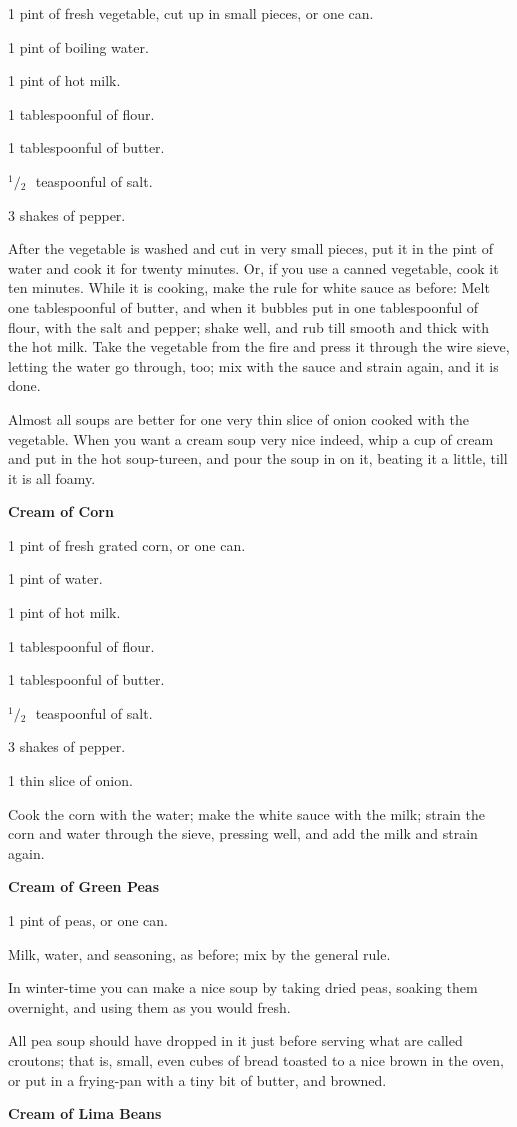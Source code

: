 \documentclass[11pt]{book}
\newcommand{\indpar}{\par\noindent\hspace*{\parindent}}
\newcommand{\ingredient}{\indpar}
\newcommand{\instruction}{\indpar}
\newcommand{\OneHalf}{\ensuremath{{}^1\!\!/\!{}_2\mbox{\ }}}
\newenvironment{RecipeTitle}{\medskip\begin{center}\large\bf }{\end{center}\smallskip}
\begin{document}
\ingredient  1 pint of fresh vegetable, cut up in small pieces, or one can.
\ingredient  1 pint of boiling water.
\ingredient  1 pint of hot milk.
\ingredient  1 tablespoonful of flour.
\ingredient  1 tablespoonful of butter.
\ingredient  \OneHalf teaspoonful of salt.
\ingredient  3 shakes of pepper.
\instruction
  After the vegetable is washed and cut in very small pieces,
put it in the pint of water and cook it for twenty minutes.
Or, if you use a canned vegetable, cook it ten minutes.
While it is cooking, make the rule for white sauce as before:
Melt one tablespoonful of butter, and when it bubbles put in
one tablespoonful of flour, with the salt and pepper; shake
well, and rub till smooth and thick with the hot milk.  Take
the vegetable from the fire and press it through the wire
sieve, letting the water go through, too; mix with the sauce
and strain again, and it is done.
\instruction
  Almost all soups are better for one very thin slice of
onion cooked with the vegetable.  When you want a cream soup
very nice indeed, whip a cup of cream and put in the hot
soup-tureen, and pour the soup in on it, beating it a little,
till it is all foamy.
\begin{RecipeTitle}
Cream of Corn\label{cream_of_corn}
\end{RecipeTitle}
\ingredient  1 pint of fresh grated corn, or one can.
\ingredient  1 pint of water.
\ingredient  1 pint of hot milk.
\ingredient  1 tablespoonful of flour.
\ingredient  1 tablespoonful of butter.
\ingredient  \OneHalf teaspoonful of salt.
\ingredient  3 shakes of pepper.
\ingredient  1 thin slice of onion.
\instruction
  Cook the corn with the water; make the white sauce with the
milk; strain the corn and water through the sieve, pressing
well, and add the milk and strain again.
\begin{RecipeTitle}
Cream of Green Peas\label{cream_of_green_peas}
\end{RecipeTitle}
\ingredient  1 pint of peas, or one can.
\ingredient  Milk, water, and seasoning, as before; mix by the general
rule.
\instruction
  In winter-time you can make a nice soup by taking dried
peas, soaking them overnight, and using them as you would
fresh.
\instruction
  All pea soup should have dropped in it just before serving
what are called croutons; that is, small, even cubes of bread
toasted to a nice brown in the oven, or put in a frying-pan
with a tiny bit of butter, and browned.
\begin{RecipeTitle}
Cream of Lima Beans\label{cream_of_lima_beans}
\end{RecipeTitle}
\end{document}
